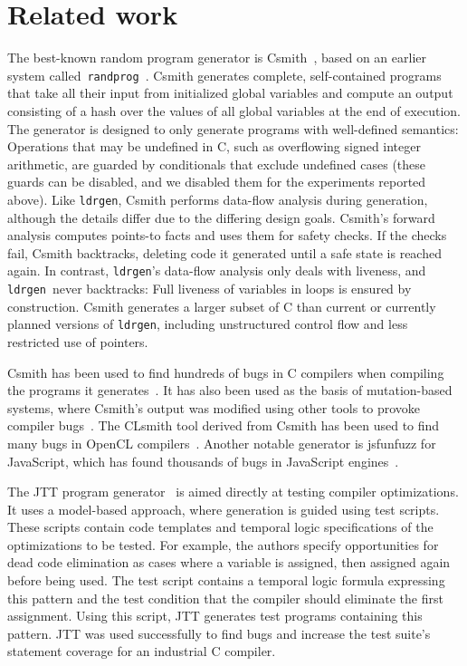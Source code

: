 \documentclass[a4paper]{easychair}
\newcommand\ldrgen{\texttt{ldrgen}}
\begin{document}
\section{Related work}

The best-known random program generator is Csmith~\cite{csmith-2011}, based
on an earlier system
called~\texttt{randprog}~\cite{eide.regehr-2008,randprog-2007}. Csmith
generates complete, self-contained programs that take all their input from
initialized global variables and compute an output consisting of a hash over
the values of all global variables at the end of execution. The generator is
designed to only generate programs with well-defined semantics: Operations
that may be undefined in C, such as overflowing signed integer arithmetic,
are guarded by conditionals that exclude undefined cases (these guards can
be disabled, and we disabled them for the experiments reported above). Like
\ldrgen, Csmith performs data-flow analysis during generation, although the
details differ due to the differing design goals. Csmith's forward analysis
computes points-to facts and uses them for safety checks. If the checks
fail, Csmith backtracks, deleting code it generated until a safe state is
reached again. In contrast, \ldrgen's data-flow analysis only deals with
liveness, and \ldrgen\ never backtracks: Full liveness of variables in loops
is ensured by construction. Csmith generates a larger subset of C than
current or currently planned versions of \ldrgen, including unstructured
control flow and less restricted use of pointers.

Csmith has been used to find hundreds of bugs in C compilers when compiling
the programs it generates~\cite{csmith-2011}. It has also been used as the
basis of mutation-based systems, where Csmith's output was modified using
other tools to provoke compiler bugs~\cite{le.etal-2014}. The CLsmith tool
derived from Csmith has been used to find many bugs in OpenCL
compilers~\cite{lidbury.etal-2015}. Another notable generator is jsfunfuzz
for JavaScript, which has found thousands of bugs in JavaScript
engines~\cite{jsfunfuzz}.


The JTT program generator~\cite{zhao.etal-2009} is aimed directly at testing
compiler optimizations. It uses a model-based approach, where generation is
guided using test scripts. These scripts contain code templates and temporal
logic specifications of the optimizations to be tested. For example, the
authors specify opportunities for dead code elimination as cases where a
variable is assigned, then assigned again before being used. The test script
contains a temporal logic formula expressing this pattern and the test
condition that the compiler should eliminate the first assignment. Using
this script, JTT generates test programs containing this pattern. JTT was
used successfully to find bugs and increase the test suite's statement
coverage for an industrial C compiler.
\end{document}
